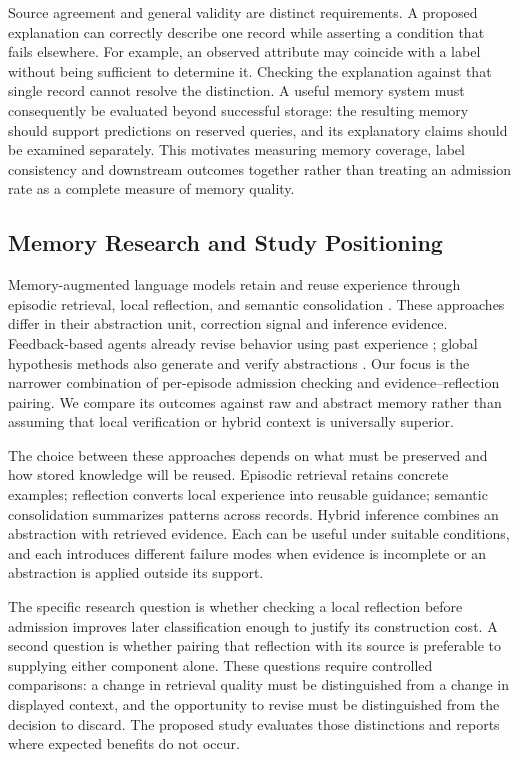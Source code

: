 \documentclass[journal]{IEEEtran}
\theoremstyle{definition}
\theoremstyle{remark}
\begin{document}
Source agreement and general validity are distinct requirements. A proposed explanation can correctly describe one record while asserting a condition that fails elsewhere. For example, an observed attribute may coincide with a label without being sufficient to determine it. Checking the explanation against that single record cannot resolve the distinction. A useful memory system must consequently be evaluated beyond successful storage: the resulting memory should support predictions on reserved queries, and its explanatory claims should be examined separately. This motivates measuring memory coverage, label consistency and downstream outcomes together rather than treating an admission rate as a complete measure of memory quality.

\subsection{Memory Research and Study Positioning}
Memory-augmented language models retain and reuse experience through episodic retrieval, local reflection, and semantic consolidation \cite{wu2025from,zhang2024survey}. These approaches differ in their abstraction unit, correction signal and inference evidence. Feedback-based agents already revise behavior using past experience \cite{shinn2023reflexion,wang2024voyager}; global hypothesis methods also generate and verify abstractions \cite{agarwal2026hypothesis,he2024idea}. Our focus is the narrower combination of per-episode admission checking and evidence--reflection pairing. We compare its outcomes against raw and abstract memory rather than assuming that local verification or hybrid context is universally superior.

The choice between these approaches depends on what must be preserved and how stored knowledge will be reused. Episodic retrieval retains concrete examples; reflection converts local experience into reusable guidance; semantic consolidation summarizes patterns across records. Hybrid inference combines an abstraction with retrieved evidence. Each can be useful under suitable conditions, and each introduces different failure modes when evidence is incomplete or an abstraction is applied outside its support.

The specific research question is whether checking a local reflection before admission improves later classification enough to justify its construction cost. A second question is whether pairing that reflection with its source is preferable to supplying either component alone. These questions require controlled comparisons: a change in retrieval quality must be distinguished from a change in displayed context, and the opportunity to revise must be distinguished from the decision to discard. The proposed study evaluates those distinctions and reports where expected benefits do not occur.
\end{document}

